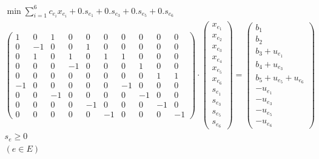 \documentclass[10pt]{article}
\begin{document}
$$
\begin{gathered}
\min \sum_{i=1}^{6} c_{e_{i}} x_{e_{i}}+0 . s_{e_{1}}+0 . s_{e_{3}}+0 . s_{e_{5}}+0 . s_{e_{6}} \\
\left(\begin{array}{cccccccccc}
1 & 0 & 1 & 0 & 0 & 0 & 0 & 0 & 0 & 0 \\
0 & -1 & 0 & 0 & 1 & 0 & 0 & 0 & 0 & 0 \\
0 & 1 & 0 & 1 & 0 & 1 & 1 & 0 & 0 & 0 \\
0 & 0 & 0 & -1 & 0 & 0 & 0 & 1 & 0 & 0 \\
0 & 0 & 0 & 0 & 0 & 0 & 0 & 0 & 1 & 1 \\
-1 & 0 & 0 & 0 & 0 & 0 & -1 & 0 & 0 & 0 \\
0 & 0 & -1 & 0 & 0 & 0 & 0 & -1 & 0 & 0 \\
0 & 0 & 0 & 0 & -1 & 0 & 0 & 0 & -1 & 0 \\
0 & 0 & 0 & 0 & 0 & -1 & 0 & 0 & 0 & -1
\end{array}\right) \cdot\left(\begin{array}{c}
x_{e_{1}} \\
x_{e_{2}} \\
x_{e_{3}} \\
x_{e_{4}} \\
x_{e_{5}} \\
x_{e_{6}} \\
s_{e_{1}} \\
s_{e_{3}} \\
s_{e_{5}} \\
s_{e_{6}}
\end{array}\right)=\left(\begin{array}{c}
b_{1} \\
b_{2} \\
b_{3}+u_{e_{1}} \\
b_{4}+u_{e_{3}} \\
b_{5}+u_{e_{5}}+u_{e_{6}} \\
-u_{e_{1}} \\
-u_{e_{3}} \\
-u_{e_{5}} \\
-u_{e_{6}}
\end{array}\right) \\
s_{e} \geq 0 \\
(e \in E)
\end{gathered}
$$
\end{document}

